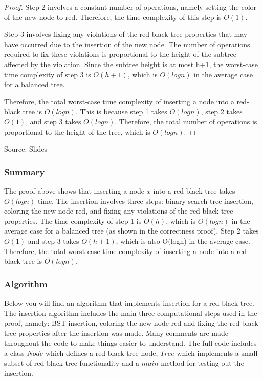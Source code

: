 \documentclass[10pt]{article}
\begin{document}
\begin{proof}
    \spacing
    \noindent
    Step 2 involves a constant number of operations, namely setting the color of
    the new node to red. Therefore, the time complexity of this step is $O(1)$.

    \spacing
    \noindent
    Step 3 involves fixing any violations of the red-black tree properties that
    may have occurred due to the insertion of the new node. The number of operations
    required to fix these violations is proportional to the height of the subtree
    affected by the violation. Since the subtree height is at most h+1, the worst-case
    time complexity of step 3 is $O(h+1)$, which is $O(log n)$ in the average
    case for a balanced tree.

    \spacing
    \noindent
    Therefore, the total worst-case time complexity of inserting a node into a red-black
    tree is $O(log n)$. This is because step 1 takes $O(log n)$, step 2 takes $O(
    1)$, and step 3 takes $O(log n)$. Therefore, the total number of operations
    is proportional to the height of the tree, which is $O(log n)$.
  \end{proof}

  \noindent
  Source: Slides

  \subsubsection*{Summary}


  The proof above shows that inserting a node $x$ into a red-black tree takes $O(
  logn)$ time. The insertion involves three steps: binary search tree insertion,
  coloring the new node red, and fixing any violations of the red-black tree properties.
  The time complexity of step 1 is $O(h)$, which is $O(logn)$ in the average case
  for a balanced tree (as shown in the correctness proof). Step 2 takes $O(1)$
  and step 3 takes $O(h+1)$, which is also O(logn) in the average case. Therefore,
  the total worst-case time complexity of inserting a node into a red-black tree
  is $O(logn)$.

  \subsubsection*{Algorithm}


  Below you will find an algorithm that implements insertion for a red-black
  tree. The insertion algorithm includes the main three computational steps used
  in the proof, namely: BST insertion, coloring the new node red and fixing the
  red-black tree properties after the insertion was made. Many comments are made
  throughout the code to make things easier to understand. The full code
  includes a class $Node$ which defines a red-black tree node, $Tree$ which implements
  a small subset of red-black tree functionality and a $main$ method for testing
  out the insertion.
\end{document}
